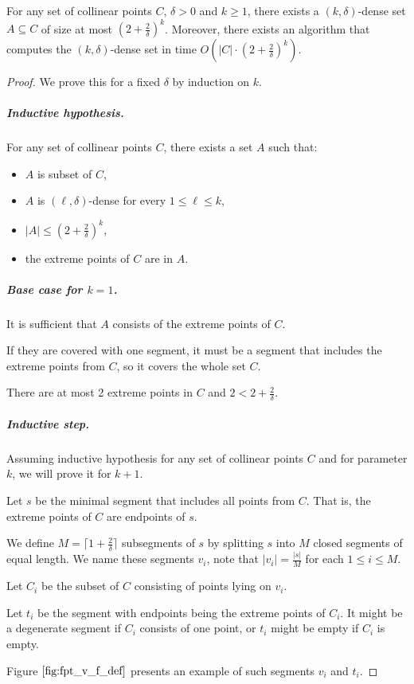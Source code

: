 \begin{lemma}
	\label{dense_set_exists}
	For any set of collinear points $C$, $\delta > 0$ and $k \ge 1$,
	there exists a $(k,\delta)$-dense set $A \subseteq C$ of size
	at most $(2+\frac{2}{\delta})^k$.
	Moreover, there exists an algorithm that computes the $(k,\delta)$-dense set
	in time $O(|C| \cdot (2+\frac{2}{\delta})^k)$.
\end{lemma}

\begin{proof}
We prove this for a fixed $\delta$ by induction on $k$.

\subparagraph{Inductive hypothesis.}
For any set of collinear points $C$, there exists a set $A$ such that:
\begin{itemize}
\item $A$ is subset of $C$,
\item $A$ is $(\ell, \delta)$-dense for every $1 \le \ell \le k$,
\item $|A| \le (2+\frac{2}{\delta})^k$,
\item the extreme points of $C$ are in $A$.
\end{itemize}

\subparagraph{Base case for $k = 1$.}
It is sufficient that $A$ consists of the extreme points of $C$.

If they are covered with one segment, it must be a segment 
that includes the extreme points from $C$, so it covers the whole set $C$.

There are at most 2 extreme points in $C$ and $2 < 2+\frac{2}{\delta}$.

\subparagraph{Inductive step.}
Assuming inductive hypothesis for any set of collinear points $C$
and for parameter $k$, we will prove it for $k+1$.

Let $s$ be the minimal segment that includes all points from $C$.
That is, the extreme points of $C$ are endpoints of $s$.

We define $M = \lceil1+\frac{2}{\delta}\rceil$ subsegments of $s$
by splitting $s$ into $M$ closed segments of equal length.
We name these segments $v_i$, note that
$|v_i| = \frac{|s|}{M}$ for each $1 \le i \le M$.

Let $C_i$ be the subset of $C$ consisting of points lying on $v_i$.

Let $t_i$ be the segment with endpoints being the extreme points of $C_i$.
It might be a degenerate segment if $C_i$ consists of one point,
or $t_i$ might be empty if $C_i$ is empty.

Figure $\ref{fig:fpt_v_f_def}$ presents an example
of such segments $v_i$ and $t_i$.


\end{proof}
